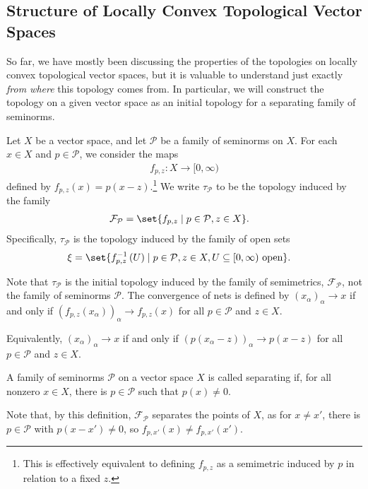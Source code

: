 \documentclass[10pt]{mypackage}
\begin{document}
\subsection{Structure of Locally Convex Topological Vector Spaces}%
So far, we have mostly been discussing the properties of the topologies on locally convex topological vector spaces, but it is valuable to understand just exactly \textit{from where} this topology comes from. In particular, we will construct the topology on a given vector space as an initial topology for a separating family of seminorms.
\begin{definition}
  Let $X$ be a vector space, and let $\mathcal{P}$ be a family of seminorms on $X$. For each $x\in X$  and $p\in \mathcal{P}$, we consider the maps
  \begin{align*}
    f_{p,z}:X\rightarrow [0,\infty)
  \end{align*}
  defined by $f_{p,z}(x) = p\left(x-z\right)$.\footnote{This is effectively equivalent to defining $f_{p,z}$ as a semimetric induced by $p$ in relation to a fixed $z$.} We write $\tau_{\mathcal{P}}$ to be the topology induced by the family
  \begin{align*}
    \mathcal{F}_{\mathcal{P}} &= \set{f_{p,z}\mid p\in \mathcal{P},z\in X}.
  \end{align*}
  Specifically, $\tau_{\mathcal{P}}$ is the topology induced by the family of open sets
  \begin{align*}
    \xi &= \set{f_{p,z}^{-1}\left(U\right)\mid p\in \mathcal{P},z\in X,U\subseteq [0,\infty)\text{ open}}.
  \end{align*}
\end{definition}
\begin{remark}
  Note that $\tau_{\mathcal{P}}$ is the initial topology induced by the family of semimetrics, $\mathcal{F}_{\mathcal{P}}$, not the family of seminorms $\mathcal{P}$. The convergence of nets is defined by $\left(x_{\alpha}\right)_{\alpha}\rightarrow x$ if and only if $\left(f_{p,z}\left(x_{\alpha}\right)\right)_{\alpha}\rightarrow f_{p,z}\left(x\right)$ for all $p\in \mathcal{P}$ and $z\in X$.\newline

  Equivalently, $\left(x_{\alpha}\right)_{\alpha}\rightarrow x$ if and only if $\left(p\left(x_{\alpha}-z\right)\right)_{\alpha}\rightarrow p\left(x-z\right)$ for all $p\in \mathcal{P}$ and $z\in X$.
\end{remark}
\begin{definition}
A family of seminorms $\mathcal{P}$ on a vector space $X$ is called separating if, for all nonzero $x\in X$, there is $p\in \mathcal{P}$ such that $p(x)\neq 0$.
\end{definition}
Note that, by this definition, $\mathcal{F}_{\mathcal{P}}$ separates the points of $X$, as for $x\neq x'$, there is $p\in \mathcal{P}$ with $p\left(x-x'\right)\neq 0$, so $f_{p,x'}\left(x\right)\neq f_{p,x'}\left(x'\right)$.\newline
\end{document}
